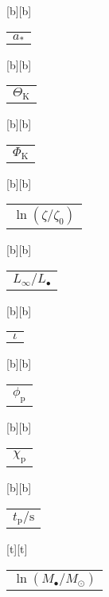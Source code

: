 %    
%
%
\begin{psfrags}%
\psfragscanon%
%
[b][b]{\color[rgb]{0,0,0}\setlength{\tabcolsep}{0pt}\begin{tabular}{c}{$a_\ast$}\end{tabular}}%
[b][b]{\color[rgb]{0,0,0}\setlength{\tabcolsep}{0pt}\begin{tabular}{c}{$\Theta_\mathrm{K}$}\end{tabular}}%
[b][b]{\color[rgb]{0,0,0}\setlength{\tabcolsep}{0pt}\begin{tabular}{c}{$\Phi_\mathrm{K}$}\end{tabular}}%
[b][b]{\color[rgb]{0,0,0}\setlength{\tabcolsep}{0pt}\begin{tabular}{c}{$\ln(\zeta/\zeta_0)$}\end{tabular}}%
[b][b]{\color[rgb]{0,0,0}\setlength{\tabcolsep}{0pt}\begin{tabular}{c}{$L_\infty/L_\bullet$}\end{tabular}}%
[b][b]{\color[rgb]{0,0,0}\setlength{\tabcolsep}{0pt}\begin{tabular}{c}{$\iota$}\end{tabular}}%
[b][b]{\color[rgb]{0,0,0}\setlength{\tabcolsep}{0pt}\begin{tabular}{c}{$\phi_\mathrm{p}$}\end{tabular}}%
[b][b]{\color[rgb]{0,0,0}\setlength{\tabcolsep}{0pt}\begin{tabular}{c}{$\chi_\mathrm{p}$}\end{tabular}}%
[b][b]{\color[rgb]{0,0,0}\setlength{\tabcolsep}{0pt}\begin{tabular}{c}{$t_\mathrm{p}/\mathrm{s}$}\end{tabular}}%
[t][t]{\color[rgb]{0,0,0}\setlength{\tabcolsep}{0pt}\begin{tabular}{c}{$\ln(M_\bullet/M_\odot)$}\end{tabular}}%

\end{psfrags}
